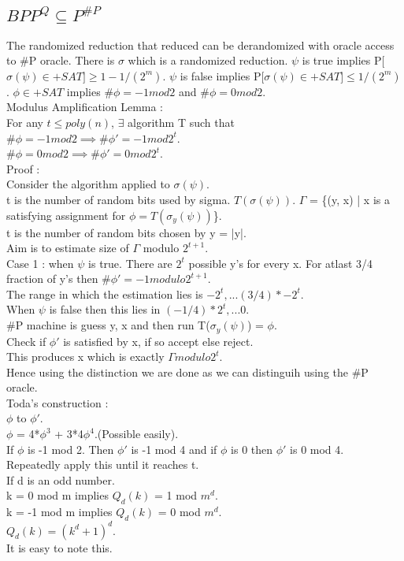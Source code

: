 \documentclass[solution,addpoints,12pt]{exam}
\begin{document}
\subsection{$BPP^{Q} \subseteq P^{\#P}$}
The randomized reduction that reduced can be derandomized with oracle access
to \#P oracle. There is $\sigma$ which is a randomized reduction.
$\psi$ is true implies P[$\sigma(\psi) \in +SAT] \ge 1-1/(2^m)$.
$\psi$ is false implies P[$\sigma(\psi) \in +SAT] \le 1/(2^m)$.
$\phi \in +SAT$ implies $\# \phi = -1 mod 2$ and $\# \phi = 0 mod 2$.\\
Modulus Amplification Lemma :\\
For any $t \le poly(n)$, $\exists$ algorithm T such that
$\#\phi = -1 mod 2 \implies \#\phi' = -1 mod 2^t$.\\
$\#\phi = 0 mod 2 \implies \#\phi' = 0 mod 2^t$.\\
Proof :\\


Consider the algorithm applied to $\sigma(\psi)$.\\
t is the number of random bits used by sigma.
$T(\sigma(\psi))$. $\Gamma$ = \{(y, x) | x is a satisfying assignment
for $\phi = T(\sigma_y(\psi))$\}.\\
t is the number of random bits chosen by y = |y|.\\
Aim is to estimate size of $\Gamma$ modulo $2^{t+1}$.\\
Case 1 : when $\psi$ is true. There are $2^t$ possible y's for every
x. For atlast 3/4 fraction of y's
then $\#\phi' = -1 modulo 2^{t+1}$.\\
The range in which the estimation lies is $- 2^t, ... (3/4)*-2^t$.\\
When $\psi$ is false then this lies in $(-1/4)*2^t, ... 0$.\\
\#P machine is guess y, x and then run T($\sigma_y(\psi)$) = $\phi$.\\
Check if $\phi'$ is satisfied by x, if so accept else reject.\\
This produces x which is exactly $\Gamma modulo 2^t$.\\
Hence using the distinction we are done as we can distinguih using the
\#P oracle.\\
Toda's construction :\\
$\phi$ to $\phi'$.\\
$\phi$ = 4*$\phi^3$ + 3*4$\phi^4$.(Possible easily).\\
If $\phi$ is -1 mod 2. Then $\phi'$ is -1 mod 4 and if $\phi$
is 0 then $\phi'$ is 0 mod 4.\\
Repeatedly apply this until it reaches t.\\
If d is an odd number.\\
k = 0 mod m implies $Q_d(k)$ = 1 mod $m^d$.\\
k = -1 mod m implies $Q_d(k)$ = 0 mod $m^d$.\\
$Q_d(k) = (k^d + 1)^d$.\\
It is easy to note this.\\
\end{document}
